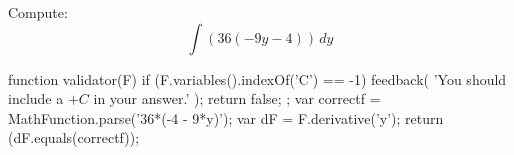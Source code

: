 \documentclass{ximera}
\renewcommand{\d}{\, d}
\begin{document}
\begin{exercise}
Compute: 
\[
\int \left(36 (-9 y-4)\right)\d y
\]
\begin{expressionAnswer}
     function validator(F) {
      if (F.variables().indexOf('C') == -1) {
        feedback( 'You should include a $+C$ in your answer.' );
        return false;
      };      
      var correctf = MathFunction.parse('36*(-4 - 9*y)');
      var dF = F.derivative('y');
      return (dF.equals(correctf));
    }
\end{expressionAnswer}
\end{exercise}
\end{document}
